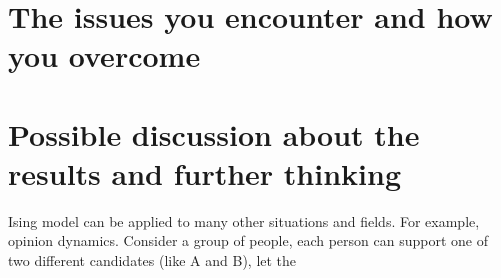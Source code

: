 \documentclass[11pt,openany]{book}              %
\begin{document}
\section{The issues you encounter and how you overcome }

\section{ Possible discussion about the results and further thinking }
Ising model can be applied to many other situations and fields. For example, opinion dynamics.
Consider a group of people, each person can support one of two different candidates (like A and B),
let the 

%
%
\end{document}
